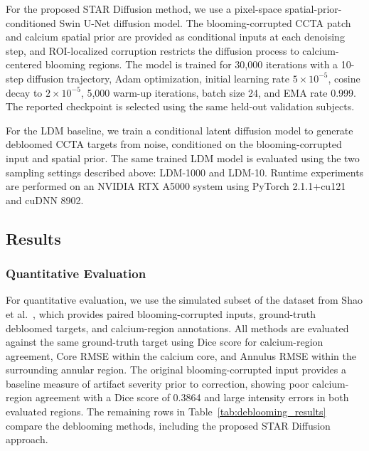 \documentclass[singleLetter,times]{sagej}
\begin{document}
For the proposed STAR Diffusion method, we use a pixel-space spatial-prior-conditioned Swin U-Net diffusion model. The blooming-corrupted CCTA patch and calcium spatial prior are provided as conditional inputs at each denoising step, and ROI-localized corruption restricts the diffusion process to calcium-centered blooming regions. The model is trained for 30{,}000 iterations with a 10-step diffusion trajectory, Adam optimization, initial learning rate $5\times10^{-5}$, cosine decay to $2\times10^{-5}$, 5{,}000 warm-up iterations, batch size 24, and EMA rate 0.999. The reported checkpoint is selected using the same held-out validation subjects.

For the LDM baseline, we train a conditional latent diffusion model to generate debloomed CCTA targets from noise, conditioned on the blooming-corrupted input and spatial prior. The same trained LDM model is evaluated using the two sampling settings described above: LDM-1000 and LDM-10. Runtime experiments are performed on an NVIDIA RTX A5000 system using PyTorch 2.1.1+cu121 and cuDNN 8902.

\subsection{Results}

\subsubsection{Quantitative Evaluation}
For quantitative evaluation, we use the simulated subset of the dataset from Shao et al.~\cite{shao2026deblooming}, which provides paired blooming-corrupted inputs, ground-truth debloomed targets, and calcium-region annotations. All methods are evaluated against the same ground-truth target using Dice score for calcium-region agreement, Core RMSE within the calcium core, and Annulus RMSE within the surrounding annular region. The original blooming-corrupted input provides a baseline measure of artifact severity prior to correction, showing poor calcium-region agreement with a Dice score of 0.3864 and large intensity errors in both evaluated regions. The remaining rows in Table~\ref{tab:deblooming_results} compare the deblooming methods, including the proposed STAR Diffusion approach.
\end{document}
